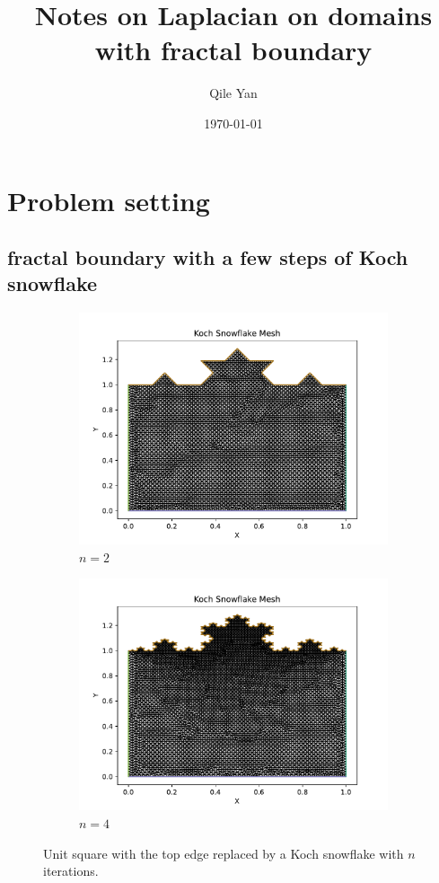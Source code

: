 \documentclass[12pt]{article}%
\theoremstyle{plain}
\numberwithin{equation}{section}
\begin{document}
\title{Notes on Laplacian on domains with fractal boundary}
\author{Qile Yan}
\date{\today}
\maketitle
\section{Problem setting } 
\subsection{fractal boundary with a few steps of Koch snowflake}
  \begin{figure}[H]%
    \centering
         \begin{subfigure}[h]{0.45\linewidth}
         \caption{$n=2$}
\includegraphics[width=\linewidth]{figures/Ex1/Ex1_snow_n2.pdf}
\end{subfigure}
 \begin{subfigure}[h]{0.45\linewidth}
 \caption{$n=4$}
\includegraphics[width=\linewidth]{figures/Ex1/Ex1_snow_n4.pdf}
\end{subfigure}
  \caption{Unit square with the top edge replaced by a Koch snowflake with $n$ iterations.}
  \label{fig:snow_2d}
 \end{figure}
\end{document}
